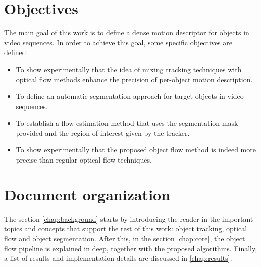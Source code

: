 \section{Objectives}

The main goal of this work is to define a dense motion descriptor for objects in video sequences. 
In order to achieve this goal, some specific objectives are defined:

\begin{itemize}

  \item To show experimentally that the idea of mixing tracking techniques with optical flow methods enhance the precision of per-object motion description.
  \item To define an automatic segmentation approach for target objects in video sequences.
  \item To establish a flow estimation method that uses the segmentation mask provided and the region of interest given by the tracker.
  \item To show experimentally that the proposed object flow method is indeed more precise than regular optical flow techniques.

\end{itemize}

\section{Document organization}

The section \ref{chap:background} starts by introducing the reader in the important topics and concepts that support the rest of this work: 
object tracking, optical flow and object segmentation. After this, in the section \ref{chap:core}, the object flow pipeline is explained in deep, 
together with the proposed algorithms. Finally, a list of results and implementation details are discussed in \ref{chap:results}.


